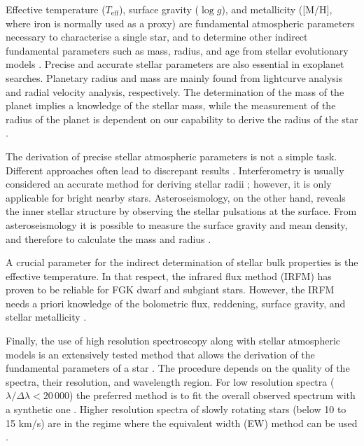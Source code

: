 \documentclass{aa}
\begin{document}
Effective temperature ($T_\mathrm{eff}$), surface gravity ($\log g$),
and metallicity ([M/H], where iron is normally used as a proxy)
are fundamental atmospheric parameters necessary to characterise a single
star, and to determine other indirect fundamental parameters
such as mass, radius, and age from stellar evolutionary models
\citep[see e.g.][]{Girardi2000,Dotter2008,Baraffe2015}.
Precise and accurate stellar parameters are also essential in
exoplanet searches. Planetary radius and mass are mainly found from
lightcurve analysis and radial velocity analysis, respectively. The
determination of the mass of the planet implies a knowledge of the
stellar mass, while the measurement of the radius of the planet
is dependent on our capability to derive the radius of the star
\citep[see e.g.][]{Torres2008,Ammler2009,Torres2012}.

The derivation of precise stellar atmospheric parameters is not a simple task.
Different approaches often lead to discrepant results
\citep[see e.g.][]{Santos13}. Interferometry is usually considered  an accurate
method for deriving stellar radii \citep[e.g.][]{Boyajian2012}; however, it is
only applicable for bright nearby stars. Asteroseismology, on the other hand,
reveals the inner stellar structure by observing the stellar pulsations at the
surface. From asteroseismology it is possible to measure the surface gravity and
mean density, and therefore to calculate the mass and radius
\citep[e.g.][]{Kjeldsen1995}.

A crucial parameter for the indirect determination of stellar bulk
properties is the effective temperature. In that respect, the infrared
flux method (IRFM) has proven to be reliable for FGK dwarf and
subgiant stars. However, the IRFM needs a priori knowledge of the
bolometric flux, reddening, surface gravity, and stellar metallicity
\citep{Blackwell1977,Ramirez2005b,Casagrande2010}.

Finally, the use of high resolution spectroscopy along with stellar atmospheric
models is an extensively tested method that allows the derivation of the
fundamental parameters of a star \citep[see e.g.][]{Valenti2005,Santos13}. The
procedure depends on the quality of the spectra, their resolution, and
wavelength region. For low resolution spectra ($\lambda/\Delta\lambda <
20\,000$) the preferred method is to fit the overall observed spectrum with a
synthetic one \citep[see e.g.][]{Recio2006}. Higher resolution spectra of slowly
rotating stars (below 10 to 15 \si{km/s})  are in the regime where the
equivalent width (EW) method can be used
\citep[see e.g.][for details]{Andreasen2017}.
\end{document}
